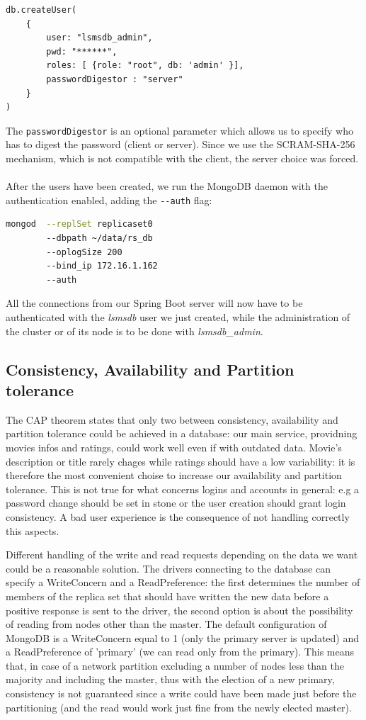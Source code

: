 \documentclass[11pt]{article}
\begin{document}
\begin{lstlisting}
db.createUser(
	{
		user: "lsmsdb_admin",
		pwd: "******",
		roles: [ {role: "root", db: 'admin' }],
		passwordDigestor : "server"
	}
)
\end{lstlisting}

The \lstinline{passwordDigestor} is an optional parameter which allows us to specify who has to digest the password (client or server). Since we use the SCRAM-SHA-256 mechanism, which is not compatible with the client, the server choice was forced.
\\
\\
After the users have been created, we run the MongoDB daemon with the authentication enabled, adding the \lstinline{--auth} flag:

\begin{lstlisting}[language=bash]
mongod 	--replSet replicaset0
		--dbpath ~/data/rs_db
		--oplogSize 200 
		--bind_ip 172.16.1.162
		--auth
\end{lstlisting}

All the connections from our Spring Boot server will now have to be authenticated with the \textit{lsmsdb} user we just created, while the administration of the cluster or of its node is to be done with \textit{lsmsdb\_admin}.

\subsection{Consistency, Availability and Partition tolerance}
The CAP theorem states that only two between consistency, availability and partition tolerance could be achieved in a database: our main service, providning movies infos and ratings, could work well even if with outdated data.
Movie's description or title rarely chages while ratings should have a low variability: it is therefore the most convenient choise to increase our availability and partition tolerance.
This is not true for what concerns logins and accounts in general: e.g a password change should be set in stone or the user creation should grant login consistency. A bad user experience is the consequence of not handling correctly this aspects.

Different handling of the write and read requests depending on the data we want could be a reasonable solution.
The drivers connecting to the database can specify a WriteConcern and a ReadPreference: the first determines the number of members of the replica set that should have written the new data before a positive response is sent to the driver, the second option is about the possibility of reading from nodes other than the master.
The default configuration of MongoDB is a WriteConcern equal to 1 (only the primary server is updated) and a ReadPreference of 'primary' (we can read only from the primary). This means that, in case of a network partition excluding a number of nodes less than the majority and including the master, thus with the election of a new primary, consistency is not guaranteed since a write could have been made just before the partitioning (and the read would work just fine from the newly elected master).
\end{document}
